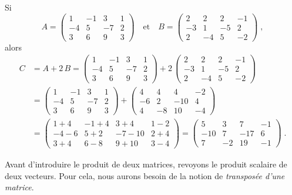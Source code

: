 {\begin{egg}
Si
\[
A = \begin{pmatrix} 1 & -1 & 3 & 1 \\ -4 & 5 & -7 & 2 \\ 3 & 6 & 9 & 3
\end{pmatrix} \quad \text{et} \quad
B = \begin{pmatrix} 2 & 2 & 2 & -1 \\ -3 & 1 & -5 & 2 \\ 2 & -4 & 5 & -2
\end{pmatrix} \; ,
\]
alors
\begin{align*}
C &= A + 2\, B =
\begin{pmatrix} 1 & -1 & 3 & 1 \\ -4 & 5 & -7 & 2 \\ 3 & 6 & 9 & 3
\end{pmatrix}
+ 2\,
\begin{pmatrix} 2 & 2 & 2 & -1 \\ -3 & 1 & -5 & 2 \\ 2 & -4 & 5 & -2
\end{pmatrix} \\
&=
\begin{pmatrix} 1 & -1 & 3 & 1 \\ -4 & 5 & -7 & 2 \\ 3 & 6 & 9 & 3
\end{pmatrix}
+
\begin{pmatrix} 4 & 4 & 4 & -2 \\ -6 & 2 & -10 & 4 \\ 4 & -8 & 10 & -4
\end{pmatrix} \\
&=
\begin{pmatrix} 1+4 & -1+4 & 3+4 & 1-2 \\ -4-6 & 5+2 & -7-10 & 2+4 \\
3+4 & 6-8 & 9+10 & 3-4 \end{pmatrix}
=
\begin{pmatrix} 5 & 3 & 7 & -1 \\ -10 & 7 & -17 & 6 \\ 7 & -2 & 19 & -1
\end{pmatrix} \; .
\end{align*}
\end{egg}

Avant d'introduire le produit de deux matrices, revoyons le produit
scalaire de deux vecteurs.  Pour cela, nous aurons besoin de la notion de
{\em transposée d'une matrice}.

}
